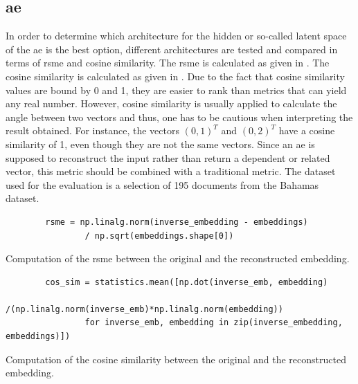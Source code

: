\subsection*{\ac{ae}}\label{subsec:evaluation-ae}

In order to determine which architecture for the hidden or so-called latent space of the \ac{ae} is the best option, 
different architectures are tested and compared in terms of \ac{rsme} and cosine similarity.
The \ac{rsme} is calculated as given in .
The cosine similarity is calculated as given in .
Due to the fact that cosine similarity values are bound by 0 and 1, they are easier to rank than metrics that can yield any real number.
However, cosine similarity is usually applied to calculate the angle between two vectors and thus, one has to be cautious when interpreting the result obtained.
For instance, the vectors $\left( 0, 1 \right)^T$ and $\left( 0, 2 \right)^T$ have a cosine similarity of 1, even though they are not the same vectors.
Since an \ac{ae} is supposed to reconstruct the input rather than return a dependent or related vector, this metric should be combined with a traditional metric.
The dataset used for the evaluation is a selection of 195 documents from the Bahamas dataset.

\begin{listing}[htp]
    \begin{verbatim}
        rsme = np.linalg.norm(inverse_embedding - embeddings) 
                / np.sqrt(embeddings.shape[0])
    \end{verbatim}
    \caption[Computation of the \ac{rsme}]{
        Computation of the \ac{rsme} between the original and the reconstructed embedding.
    }
    \label{lst:impl-rsme}
\end{listing}

\begin{listing}[htp]
    \begin{verbatim}
        cos_sim = statistics.mean([np.dot(inverse_emb, embedding)
                /(np.linalg.norm(inverse_emb)*np.linalg.norm(embedding)) 
                for inverse_emb, embedding in zip(inverse_embedding, embeddings)])
    \end{verbatim}
    \caption[Computation of the cosine similarity]{
        Computation of the cosine similarity between the original and the reconstructed embedding.
    }
    \label{lst:impl-cos_sim}
\end{listing}

